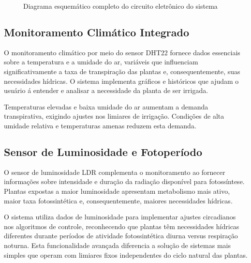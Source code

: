 \begin{figure}[htbp]
\centering
\caption{Diagrama esquemático completo do circuito eletrônico do sistema}
\label{fig:esquema_circuito}
\end{figure}

\subsection{Monitoramento Climático Integrado}

O monitoramento climático por meio do sensor DHT22 fornece dados essenciais sobre a temperatura e a umidade do ar, variáveis que influenciam significativamente a taxa de transpiração das plantas e, consequentemente, suas necessidades hídricas. O sistema implementa gráficos e históricos que ajudam o usuário á entender e analisar a necessidade da planta de ser irrigada.

Temperaturas elevadas e baixa umidade do ar aumentam a demanda transpirativa, exigindo ajustes nos limiares de irrigação. Condições de alta umidade relativa e temperaturas amenas reduzem esta demanda.

\subsection{Sensor de Luminosidade e Fotoperíodo}

O sensor de luminosidade LDR complementa o monitoramento ao fornecer informações sobre intensidade e duração da radiação disponível para fotossíntese. Plantas expostas a maior luminosidade apresentam metabolismo mais ativo, maior taxa fotossintética e, consequentemente, maiores necessidades hídricas.

O sistema utiliza dados de luminosidade para implementar ajustes circadianos nos algoritmos de controle, reconhecendo que plantas têm necessidades hídricas diferentes durante períodos de atividade fotossintética diurna versus respiração noturna. Esta funcionalidade avançada diferencia a solução de sistemas mais simples que operam com limiares fixos independentes do ciclo natural das plantas.

